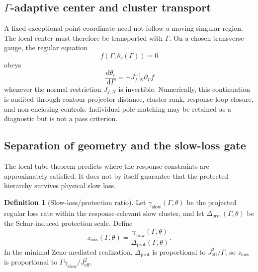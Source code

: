 \documentclass[11pt]{article}
\theoremstyle{definition}
\newtheorem{definition}[theorem]{Definition}
\theoremstyle{remark}
\newcommand{\dd}{\,\mathrm d}
\begin{document}
\subsection{\texorpdfstring{$\Gamma$}{Gamma}-adaptive center and cluster transport}

A fixed exceptional-point coordinate need not follow a moving singular region. The local center must therefore be transported with $\Gamma$. On a chosen transverse gauge, the regular equation
\begin{equation}
f(\Gamma,\theta_c(\Gamma))=0
\label{eq:center-equation}
\end{equation}
obeys
\begin{equation}
\frac{\dd\theta_c}{\dd\Gamma}
=-J_{f,N}^{-1}\partial_\Gamma f
\label{eq:center-transport}
\end{equation}
whenever the normal restriction $J_{f,N}$ is invertible. Numerically, this continuation is audited through contour-projector distance, cluster rank, response-loop closure, and non-enclosing controls. Individual pole matching may be retained as a diagnostic but is not a pass criterion.

\subsection{Separation of geometry and the slow-loss gate}

The local tube theorem predicts where the response constraints are approximately satisfied. It does not by itself guarantee that the protected hierarchy survives physical slow loss.

\begin{definition}[Slow-loss/protection ratio]\label{def:slow-loss-ratio}
Let $\gamma_{\mathrm{slow}}(\Gamma,\theta)$ be the projected regular loss rate within the response-relevant slow cluster, and let $\Delta_{\mathrm{prot}}(\Gamma,\theta)$ be the Schur-induced protection scale. Define
\begin{equation}
\boxed{
z_{\mathrm{loss}}(\Gamma,\theta)
=
\frac{\gamma_{\mathrm{slow}}(\Gamma,\theta)}
{\Delta_{\mathrm{prot}}(\Gamma,\theta)}.
}
\label{eq:slow-loss-ratio}
\end{equation}
In the minimal Zeno-mediated realization, $\Delta_{\mathrm{prot}}$ is proportional to $J_{\mathrm{eff}}^2/\Gamma$, so $z_{\mathrm{loss}}$ is proportional to $\Gamma\gamma_{\mathrm{slow}}/J_{\mathrm{eff}}^2$.
\end{definition}
\end{document}
